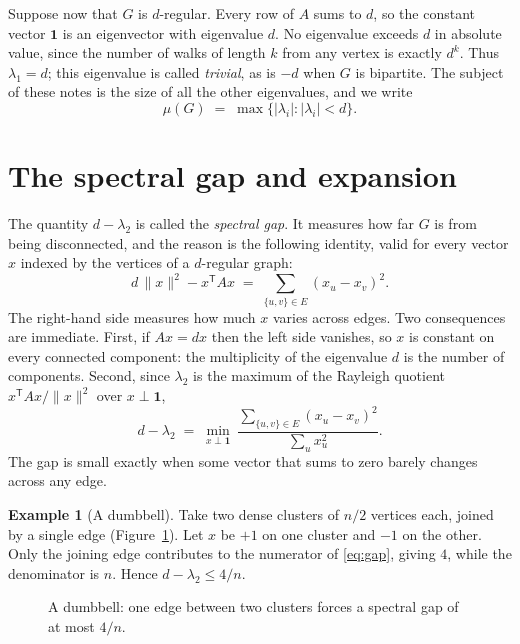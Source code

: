 \documentclass[11pt,letterpaper]{article}
\theoremstyle{definition}
\newtheorem{example}[theorem]{Example}
\theoremstyle{remark}
\newcommand{\one}{\mathbf{1}}
\begin{document}
Suppose now that $G$ is $d$-regular. Every row of $A$ sums to $d$, so the constant vector $\one$ is
an eigenvector with eigenvalue $d$. No eigenvalue exceeds $d$ in absolute value, since the number
of walks of length $k$ from any vertex is exactly $d^k$. Thus $\lambda_1=d$; this eigenvalue is
called \emph{trivial}, as is $-d$ when $G$ is bipartite. The subject of these notes is the size of
all the other eigenvalues, and we write
\[
  \mu(G)\;=\;\max\{|\lambda_i| : |\lambda_i|<d\}.
\]

\section{The spectral gap and expansion}

The quantity $d-\lambda_2$ is called the \emph{spectral gap}. It measures how far $G$ is from
being disconnected, and the reason is the following identity, valid for every vector $x$ indexed
by the vertices of a $d$-regular graph:
\begin{equation}\label{eq:dirichlet}
  d\,\lVert x\rVert^2-x^{\mathsf T}Ax\;=\;\sum_{\{u,v\}\in E}(x_u-x_v)^2 .
\end{equation}
The right-hand side measures how much $x$ varies across edges. Two consequences are immediate.
First, if $Ax=dx$ then the left side vanishes, so $x$ is constant on every connected component:
the multiplicity of the eigenvalue $d$ is the number of components. Second, since $\lambda_2$ is
the maximum of the Rayleigh quotient $x^{\mathsf T}Ax/\lVert x\rVert^2$ over $x\perp\one$,
\begin{equation}\label{eq:gap}
  d-\lambda_2\;=\;\min_{x\perp\one}\ \frac{\sum_{\{u,v\}\in E}(x_u-x_v)^2}{\sum_u x_u^2}.
\end{equation}
The gap is small exactly when some vector that sums to zero barely changes across any edge.

\begin{example}[A dumbbell]
Take two dense clusters of $n/2$ vertices each, joined by a single edge
(Figure~\ref{fig:dumbbell}). Let $x$ be $+1$ on one cluster and $-1$ on the other. Only the
joining edge contributes to the numerator of \eqref{eq:gap}, giving $4$, while the denominator is
$n$. Hence $d-\lambda_2\le 4/n$.
\end{example}

\begin{figure}[ht]
  \centering
  
  \caption{A dumbbell: one edge between two clusters forces a spectral gap of at most $4/n$.}
  \label{fig:dumbbell}
\end{figure}
\end{document}
